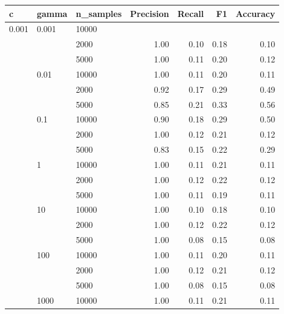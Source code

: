 \documentclass[a4paper,10pt]{article}
\begin{document}
\begin{table}[!ht]
\begin{multicols}{2}
\centering
\begin{scriptsize}
\begin{tabular}{|lllrrrr|}
\toprule
   c   &   gamma    &  n\_samples   &  Precision &     Recall &         F1 &   Accuracy \\
\midrule
0.001 & 0.001 & 10000 &            &            &            &            \\
      &       & 2000 &       1.00 &       0.10 &       0.18 &       0.10 \\
      &       & 5000 &       1.00 &       0.11 &       0.20 &       0.12 \\
      & 0.01 & 10000 &       1.00 &       0.11 &       0.20 &       0.11 \\
      &       & 2000 &       0.92 &       0.17 &       0.29 &       0.49 \\
      &       & 5000 &       0.85 &       0.21 &       0.33 &       0.56 \\
      & 0.1 & 10000 &       0.90 &       0.18 &       0.29 &       0.50 \\
      &       & 2000 &       1.00 &       0.12 &       0.21 &       0.12 \\
      &       & 5000 &       0.83 &       0.15 &       0.22 &       0.29 \\
      & 1 & 10000 &       1.00 &       0.11 &       0.21 &       0.11 \\
      &       & 2000 &       1.00 &       0.12 &       0.22 &       0.12 \\
      &       & 5000 &       1.00 &       0.11 &       0.19 &       0.11 \\
      & 10 & 10000 &       1.00 &       0.10 &       0.18 &       0.10 \\
      &       & 2000 &       1.00 &       0.12 &       0.22 &       0.12 \\
      &       & 5000 &       1.00 &       0.08 &       0.15 &       0.08 \\
      & 100 & 10000 &       1.00 &       0.11 &       0.20 &       0.11 \\
      &       & 2000 &       1.00 &       0.12 &       0.21 &       0.12 \\
      &       & 5000 &       1.00 &       0.08 &       0.15 &       0.08 \\
      & 1000 & 10000 &       1.00 &       0.11 &       0.21 &       0.11 \\

\end{tabular}
\end{scriptsize}
\end{multicols}
\end{table}
\end{document}

